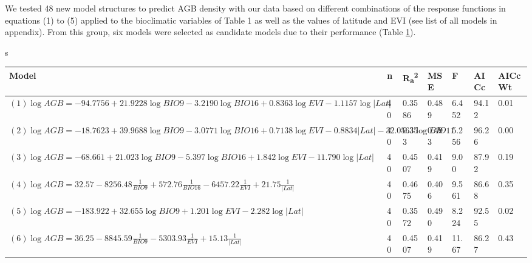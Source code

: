 \documentclass[review, authoryear]{elsarticle}   	%
\begin{document}
We tested 48 new model structures to predict AGB density with our data based on different combinations of the response functions in equations (1) to (5) applied to the bioclimatic variables of Table 1 as well as the values of latitude and EVI (see list of all models in appendix). From this group, six models were selected as candidate models due to their performance (Table \ref{tab:models}). 


\begin{table}[htbp]s
   \centering
   \begin{tabular}{p{7cm}p{0.5cm}p{1.0cm}p{1.0cm}p{1.0cm}p{1.0cm}p{1.0cm}}%
      \toprule
       Model  & n & R\textsubscript{a}\textsuperscript{2} & MSE & F & AICc & AICcWt\\
      \midrule
     $(1)\log{AGB}=-94.7756+21.9228\log{BIO9}-3.2190\log{BIO16}+0.8363\log{EVI}-1.1157\log{|Lat|}$&40&0.3586&0.489&6.452&94.12&0.01\\
     $(2)\log{AGB}=-18.7623+39.9688\log{BIO9}-3.0771\log{BIO16}+0.7138\log{EVI}-0.8834|Lat|-32.0563\log{BIO11}$ &40&0.353&0.493&5.256&96.26&0.00\\
     $(3)\log{AGB}=-68.661+21.023\log{BIO9}-5.397\log{BIO16}+1.842\log{EVI}-11.790\log{|Lat|}$&40&0.4507&0.419&9.00&87.92&0.19\\
     $(4)\log{AGB}=32.57-8256.48\frac{1}{BIO9}+572.76\frac{1}{BIO16}-6457.22\frac{1}{EVI}+21.75\frac{1}{|Lat|}$&40&0.4675&0.406&9.561&86.68&0.35\\
     $(5)\log{AGB}=-183.922+32.655\log{BIO9}+1.201\log{EVI}-2.282\log{|Lat|}$&40&0.3572&0.490&8.224&92.55&0.02\\
     $(6)\log{AGB}=36.25-8845.59\frac{1}{BIO9}-5303.93\frac{1}{EVI}+15.13\frac{1}{|Lat|}$&40&0.4507&0.419&11.67&86.27&0.43\\
      \bottomrule
  \end{tabular}
   \label{tab:models}
\end{table}
\end{document}
